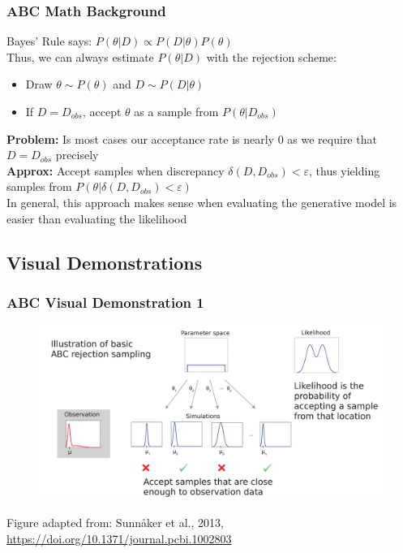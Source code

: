 \documentclass{beamer}
\begin{document}
\begin{frame}
\frametitle{ABC Math Background}
Bayes' Rule says: $P(\theta | D) \propto P(D|\theta)P(\theta)$\\
\medskip
Thus, we can always estimate $P(\theta|D)$ with the rejection scheme:\\
\begin{itemize}
\item Draw $\theta \sim P(\theta)$ and $D \sim P(D|\theta)$
\item If $D = D_{obs}$, accept $\theta$ as a sample from $P(\theta | D_{obs})$
\end{itemize}
\medskip\pause
\textbf{Problem:} Is most cases our acceptance rate is nearly 0 as we require that $D = D_{obs}$ precisely\\
\medskip\pause
\textbf{Approx:} Accept samples when discrepancy $\delta(D, D_{obs}) < \varepsilon$, thus yielding samples from $P(\theta | \delta(D, D_{obs}) < \varepsilon)$\\
\medskip\pause
In general, this approach makes sense when evaluating the generative model is easier than evaluating the likelihood
\end{frame}

\subsection{Visual Demonstrations}

\begin{frame}
\frametitle{ABC Visual Demonstration 1}
\vspace{-1em}
\begin{figure}[ht]
\centerline{\includegraphics[width=\columnwidth]{img/abc1.png}}
\end{figure}
\vspace{-1em}
\tiny{Figure adapted from: Sunn{\aa}ker et al., 2013, \url{https://doi.org/10.1371/journal.pcbi.1002803}}
\end{frame}
\end{document}
